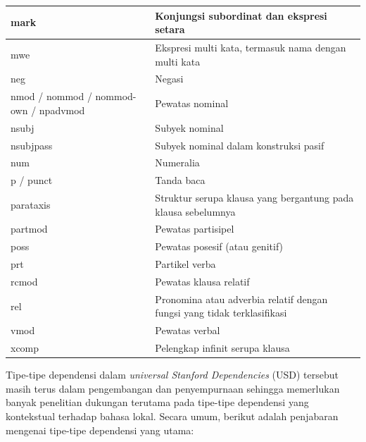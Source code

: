 \begin{center}
\begin{small}
\begin{longtable}{| p{} | p{} |}
mark & Konjungsi subordinat dan ekspresi setara \\ \hline
mwe & Ekspresi multi kata, termasuk nama dengan multi kata \\ \hline
neg & Negasi \\ \hline
nmod / nommod / nommod-own / npadvmod & Pewatas nominal \\ \hline
nsubj & Subyek nominal \\ \hline
nsubjpass & Subyek nominal dalam konstruksi pasif \\ \hline
num & Numeralia \\ \hline
p / punct & Tanda baca \\ \hline
parataxis & Struktur serupa klausa yang bergantung pada klausa sebelumnya \\ \hline
partmod & Pewatas partisipel \\ \hline
poss & Pewatas posesif (atau genitif) \\ \hline
prt & Partikel verba \\ \hline
rcmod & Pewatas klausa relatif \\ \hline
rel & Pronomina atau adverbia relatif dengan fungsi yang tidak terklasifikasi \\ \hline
vmod & Pewatas verbal \\ \hline
xcomp & Pelengkap infinit serupa klausa \\ \hline
    \hline
  \end{longtable}
\end{small}
\end{center}

Tipe-tipe dependensi dalam \textit{universal Stanford Dependencies} (USD) \citep{de2014universal} tersebut masih terus dalam pengembangan dan penyempurnaan sehingga memerlukan banyak penelitian dukungan terutama pada tipe-tipe dependensi yang kontekstual terhadap bahasa lokal. Secara umum, berikut adalah penjabaran mengenai tipe-tipe dependensi yang utama:

